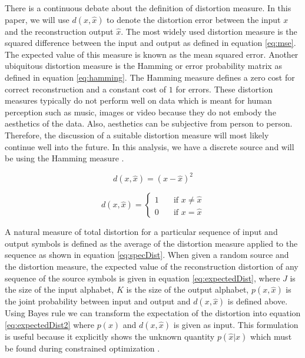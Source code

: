 \documentclass[journal]{IEEEtran}
\begin{document}
\par There is a continuous debate about the definition of distortion measure. In this paper, we will use \(d(x,\hat{x})\) to denote the distortion error between the input \(x\) and the reconstruction output \(\hat{x}\). The most widely used distortion measure is the squared difference between the input and output as defined in equation \ref{eq:mse}. The expected value of this measure is known as the mean squared error. Another ubiquitous distortion measure is the Hamming or error probability matrix as defined in equation \ref{eq:hamming}. The Hamming measure defines a zero cost for correct reconstruction and a constant cost of \(1\) for errors. These distortion measures typically do not perform well on data which is meant for human perception such as music, images or video because they do not embody the aesthetics of the data. Also, aesthetics can be subjective from person to person. Therefore, the discussion of a suitable distortion measure will most likely continue well into the future. In this analysis, we have a discrete source and will be using the Hamming measure \cite{chang}.

\begin{equation}
\label{eq:mse}
d(x, \hat{x}) = (x - \hat{x})^2
\end{equation}

\begin{equation}
\label{eq:hamming}
 d(x, \hat{x}) =
  \begin{cases}
    1 & \quad \text{if } x \neq \hat{x} \\
    0 & \quad \text{if } x = \hat{x}
  \end{cases}
\end{equation}

\par A natural measure of total distortion for a particular sequence of input and output symbols is defined as the average of the distortion measure applied to the sequence as shown in equation \ref{eq:specDist}. When given a random source and the distortion measure, the expected value of the reconstruction distortion of any sequence of the source symbols is given in equation \ref{eq:expectedDist}, where \(J\) is the size of the input alphabet, \(K\) is the size of the output alphabet, \(p(x, \hat{x})\) is the joint probability between input and output and \(d(x, \hat{x})\) is defined above. Using Bayes rule we can transform the expectation of the distortion into equation \ref{eq:expectedDist2} where \(p(x)\) and \(d(x,\hat{x})\) is given as input. This formulation is useful because it explicitly shows the unknown quantity \(p(\hat{x}|x)\) which must be found during constrained optimization \cite[p.~301-310]{cover}.
\end{document}
